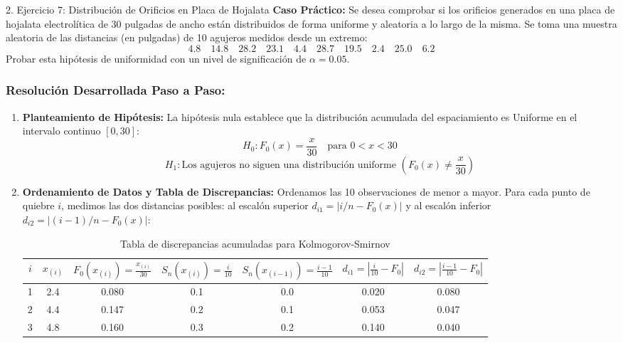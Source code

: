 \documentclass[11pt,a4paper]{article}
\begin{document}
\begin{subsection}{2. Ejercicio 7: Distribución de Orificios en Placa de Hojalata}
    \textbf{Caso Práctico:} Se desea comprobar si los orificios generados en una placa de hojalata electrolítica de $30$ pulgadas de ancho están distribuidos de forma uniforme y aleatoria a lo largo de la misma. Se toma una muestra aleatoria de las distancias (en pulgadas) de 10 agujeros medidos desde un extremo:
    \[ 4.8 \quad 14.8 \quad 28.2 \quad 23.1 \quad 4.4 \quad 28.7 \quad 19.5 \quad 2.4 \quad 25.0 \quad 6.2 \]
    Probar esta hipótesis de uniformidad con un nivel de significación de $\alpha = 0.05$.

    \subsubsection*{Resolución Desarrollada Paso a Paso:}
    \begin{enumerate}
        \item \textbf{Planteamiento de Hipótesis:}
              La hipótesis nula establece que la distribución acumulada del espaciamiento es Uniforme en el intervalo continuo $[0, 30]$:
              \[ H_0: F_0(x) = \frac{x}{30} \quad \text{para } 0 < x < 30 \]
              \[ H_1: \text{Los agujeros no siguen una distribución uniforme } (F_0(x) \neq \frac{x}{30}) \]
        \item \textbf{Ordenamiento de Datos y Tabla de Discrepancias:}
              Ordenamos las 10 observaciones de menor a mayor. Para cada punto de quiebre $i$, medimos las dos distancias posibles: al escalón superior $d_{i1} = |i/n - F_0(x)|$ y al escalón inferior $d_{i2} = |(i-1)/n - F_0(x)|$:
              \begin{table}[h!]
                  \centering
                  \small
                  \caption{Tabla de discrepancias acumuladas para Kolmogorov-Smirnov}
                  \begin{tabular}{ccccccc}
                      \toprule
                      \textbf{$i$} & $x_{(i)}$ & $F_0(x_{(i)}) = \frac{x_{(i)}}{30}$ & $S_n(x_{(i)}) = \frac{i}{10}$ & $S_n(x_{(i-1)}) = \frac{i-1}{10}$ & $d_{i1} = \left|\frac{i}{10} - F_0\right|$ & $d_{i2} = \left|\frac{i-1}{10} - F_0\right|$ \\
                      \midrule
                      1 & 2.4 & 0.080 & 0.1 & 0.0 & 0.020 & 0.080 \\
                      2 & 4.4 & 0.147 & 0.2 & 0.1 & 0.053 & 0.047 \\
                      3 & 4.8 & 0.160 & 0.3 & 0.2 & 0.140 & 0.040 \\

\end{tabular}
\end{table}
\end{enumerate}
\end{subsection}
\end{document}

